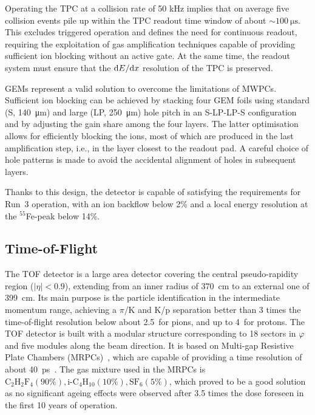 Operating the TPC at a collision rate of 50 kHz implies that on average five collision events pile up within the TPC readout time window of about $\sim\SI{100}{\micro\second}$. This excludes triggered operation and defines the need for continuous readout, requiring the exploitation of gas amplification techniques capable of providing sufficient ion blocking without an active gate. At the same time, the readout system must ensure that the $\mathrm{d} E/\mathrm{d} x$ resolution of the TPC is preserved.

GEMs represent a valid solution to overcome the limitations of MWPCs. Sufficient ion blocking can be achieved by stacking four GEM foils using standard (S, \SI{140}{\micro\meter}) and large (LP, \SI{250}{\micro\meter}) hole pitch in an S-LP-LP-S configuration and by adjusting the gain share among the four layers. The latter optimisation allows for efficiently blocking the ions, most of which are produced in the last amplification step, i.e., in the layer closest to the readout pad. A careful choice of hole patterns is made to avoid the accidental alignment of holes in subsequent layers. 

Thanks to this design, the detector is capable of satisfying the requirements for Run~3 operation, with an ion backflow below 2\% and a local energy resolution at the $^{55}$Fe-peak below 14\%.

\subsection{Time-of-Flight}
The TOF detector is a large area detector covering the central pseudo-rapidity region ($\lvert\eta\rvert < 0.9$), extending from an inner radius of 370~cm to an external one of 399~cm. Its main purpose is the particle identification in the intermediate momentum range, achieving a $\pi$/K and K/p separation better than 3 times the time-of-flight resolution below about 2.5~\gevc for pions, and up to 4~\gevc for protons. The TOF detector is built with a modular structure corresponding to 18 sectors in $\varphi$ and five modules along the beam direction. It is based on Multi-gap Resistive Plate Chambers (MRPCs)~\cite{Wang:2020iwn}, which are capable of providing a time resolution of about 40~ps~\cite{ALICE:2008ngc}. The gas mixture used in the MRPCs is $\mathrm{C_2H_2F_4 (90\%), i\text{-}C_4H_{10} (10\%), SF_6 (5\%)}$, which proved to be a good solution as no significant ageing effects were observed after 3.5 times the dose foreseen in the first 10 years of operation.

